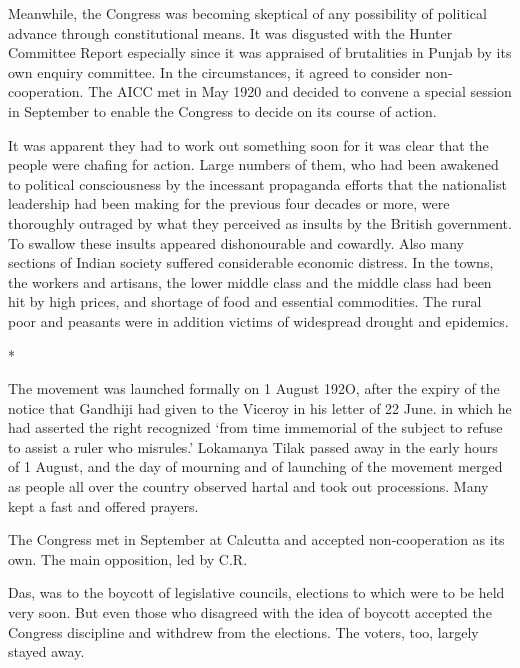 Meanwhile, the Congress was becoming skeptical of any possibility of political advance through constitutional means. It was disgusted with the Hunter Committee Report especially since it was appraised of brutalities in Punjab by its own enquiry committee. In the circumstances, it agreed to consider non­ cooperation. The AICC met in May 1920 and decided to convene a special session in September to enable the Congress to decide on its course of action. 

It was apparent they had to work out something soon for it was clear that the people were chafing for action. Large numbers of them, who had been awakened to political consciousness by the incessant propaganda efforts that the nationalist leadership had been making for the previous four decades or more, were thoroughly outraged by what they perceived as insults by the British government. To swallow these insults appeared dishonourable and cowardly. Also many sections of Indian society suffered considerable economic distress. In the towns, the workers and artisans, the lower middle class and the middle class had been hit by high prices, and shortage of food and essential commodities. The rural poor and peasants were in addition victims of widespread drought and epidemics.

\begin{center}*\end{center}



The movement was launched formally on 1 August 192O, after the expiry of the notice that Gandhiji had given to the Viceroy in his letter of 22 June. in which he had asserted the right recognized ‘from time immemorial of the subject to refuse to assist a ruler who misrules.’ Lokamanya Tilak passed away in the early hours of 1 August, and the day of mourning and of launching of the movement merged as people all over the country observed hartal and took out processions. Many kept a fast and offered prayers. 

The Congress met in September at Calcutta and accepted non-cooperation as its own. The main opposition, led by C.R. 

Das, was to the boycott of legislative councils, elections to which were to be held very soon. But even those who disagreed with the idea of boycott accepted the Congress discipline and withdrew from the elections. The voters, too, largely stayed away. 

